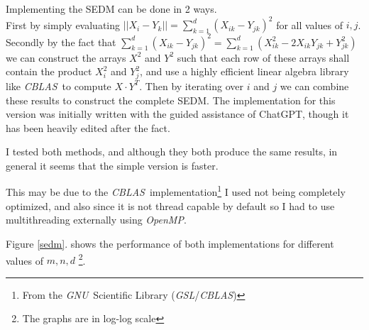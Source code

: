 \documentclass[10pt, a4paper]{article}
\newcommand{\omp}{\textit{OpenMP}}
\newcommand{\gnu}{\textit{GNU}}
\newcommand{\blas}{\textit{CBLAS}}
\newcommand{\gsl}{\textit{GSL}}
\begin{document}
Implementing the SEDM can be done in 2 ways. \\

First by simply evaluating $||X_i - Y_k|| = \sum_{k = 1}^{d} (X_{ik} - Y_{jk})^2$ for all values of $i, j$. \\

Secondly by the fact that $\sum_{k = 1}^{d} (X_{ik} - Y_{jk})^2 = 
\sum_{k = 1}^{d} (X_{ik}^2 - 2 X_{ik} Y_{jk} + Y_{jk}^2)$ we can construct the arrays $X^2$ and $Y^2$ 
such that each row of these arrays shall contain the product $X_i^2$ and  $Y_j^2$, and use a highly efficient
linear algebra library like \blas \ to compute $X \cdot Y^T$. Then by iterating over $i$ and $j$ we can combine
these results to construct the complete SEDM. The implementation for this version was initially written
with the guided assistance of ChatGPT, though it has been heavily edited after the fact.

I tested both methods, and although they both produce the same results, in general it seems that the 
simple version is faster. 

This may be due to the \blas \ implementation\footnote{From the \gnu \ Scientific Library 
(\gsl/\blas)} I used not being completely optimized, and also since it is
not thread capable by default so I had to use multithreading externally using \omp.

Figure \ref{sedm}. shows the performance of both implementations for different values of $m, n, d$
\footnote{The graphs are in log-log scale}.
\end{document}
